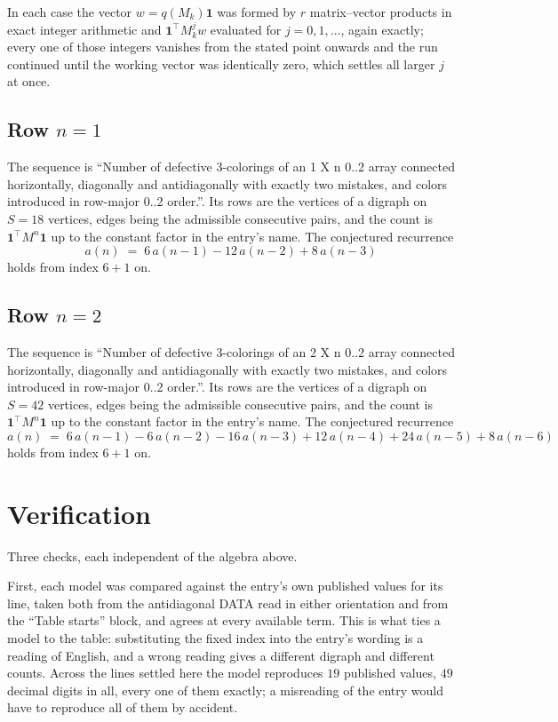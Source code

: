 \documentclass[11pt,a4paper]{article}
\theoremstyle{plain}
\theoremstyle{definition}
\begin{document}
In each case the vector $w=q(M_k)\mathbf{1}$ was formed by $r$ matrix--vector products in
exact integer arithmetic and $\mathbf{1}^{\!\top}M_k^{j}w$ evaluated for $j=0,1,\dots$,
again exactly; every one of those integers vanishes from the stated point onwards and the run
continued until the working vector was identically zero, which settles all larger $j$ at once.

\subsection*{Row $n$$=1$}
The sequence is ``Number of defective 3-colorings of an 1 X n 0..2 array connected horizontally, diagonally and antidiagonally with exactly two mistakes, and colors introduced in row-major 0..2 order.''. Its rows are the vertices of a digraph on
$S=18$ vertices, edges being the admissible consecutive pairs, and the count is
$\mathbf{1}^{\!\top}M^{n}\mathbf{1}$ up to the constant factor in the entry's name.
The conjectured recurrence
\[
a(n)\;=\;6\,a(n-1) - 12\,a(n-2) + 8\,a(n-3)
\]
holds from index $6+1$ on.

\subsection*{Row $n$$=2$}
The sequence is ``Number of defective 3-colorings of an 2 X n 0..2 array connected horizontally, diagonally and antidiagonally with exactly two mistakes, and colors introduced in row-major 0..2 order.''. Its rows are the vertices of a digraph on
$S=42$ vertices, edges being the admissible consecutive pairs, and the count is
$\mathbf{1}^{\!\top}M^{n}\mathbf{1}$ up to the constant factor in the entry's name.
The conjectured recurrence
\[
a(n)\;=\;6\,a(n-1) - 6\,a(n-2) - 16\,a(n-3) + 12\,a(n-4) + 24\,a(n-5) + 8\,a(n-6)
\]
holds from index $6+1$ on.

\section{Verification}

Three checks, each independent of the algebra above.

First, each model was compared against the entry's own published values for its line, taken
both from the antidiagonal DATA read in either orientation and from the ``Table starts''
block, and agrees at every available term. This is what ties a model to the table:
substituting the fixed index into the entry's wording is a reading of English, and a wrong
reading gives a different digraph and different counts. Across the lines settled here the
model reproduces $19$ published values, $49$ decimal digits in all, every one of
them exactly; a misreading of the entry would have to reproduce all of them by accident.
\end{document}
